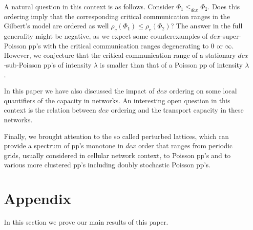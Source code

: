 \documentclass[conference]{IEEEtran}
\begin{document}
A natural question in this context is as follows. Consider
$\Phi_1\leq_{dcx}\Phi_2$. Does this ordering 
imply that the corresponding critical  communication ranges 
in the Gilbert's model are ordered as well $\rho_c(\Phi_1)\le\rho_c(\Phi_2)$?
The answer in the full generality might be negative, as we expect some
counterexamples of $dcx$-super-Poisson pp's with the critical
communication ranges degenerating to $0$ or $\infty$.
However, we conjecture that the critical communication 
range of a stationary $dcx$-sub-Poisson pp's of intensity $\lambda$
is smaller than that of a Poisson pp of intensity $\lambda$.

In this paper we have also discussed the impact of $dcx$ ordering
on some local quantifiers of the capacity in networks. 
An interesting open question in this context 
is the relation between $dcx$ ordering
and the transport capacity in these networks. 

Finally, we brought attention to the so called perturbed lattices,
which can provide a spectrum of pp's  monotone in $dcx$ order
that ranges from periodic grids, usually considered in cellular network
context, to Poisson pp's and to various more clustered pp's including
doubly stochastic Poisson pp's.
 

\appendix
\label{s.appendix} 

\section{Appendix}
In this section we prove   our main results
of this paper.
\end{document}
